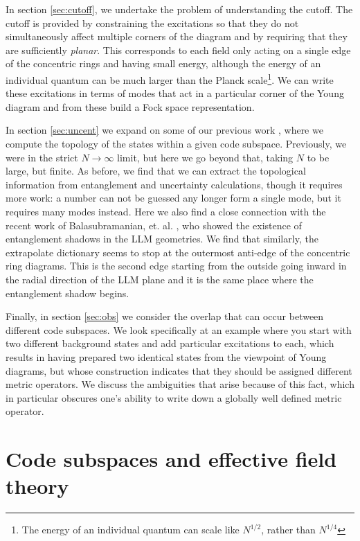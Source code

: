 \documentclass[12pt,nofootinbib, longbibliography]{revtex4-1}
\begin{document}
In section \ref{sec:cutoff}, we undertake the problem of understanding the cutoff. The cutoff is provided by constraining the excitations so that they do not simultaneously affect multiple corners of the diagram and by requiring that they are sufficiently {\em planar}. This corresponds to each field only acting on a single edge of the concentric rings and having small energy, although the energy of an individual quantum can be much larger than the Planck scale\footnote{The energy of an individual quantum can scale like $N^{1/2}$, rather than $N^{1/4}$}. We can write these excitations in terms of modes that act in a particular corner of the Young diagram and from these build a Fock space representation.

In section  \ref{sec:uncent} we expand on some of our previous work \cite{Berenstein:2017abm, Berenstein:2016pcx}, where we  compute the topology of the states within a given code subspace. Previously, we were in the strict $N\rightarrow\infty$ limit, but here we  go beyond that, taking $N$ to be large, but finite. As before, we find that we can extract the topological information from entanglement and uncertainty calculations, though it requires more work: a number can not be guessed any longer form a single mode, but it requires many modes instead.
Here we also find a close connection with the recent work of Balasubramanian, et. al. \cite{Balasubramanian:2017hgy}, who showed the existence of entanglement shadows in the LLM geometries. We find that similarly, the extrapolate dictionary seems to stop at the outermost anti-edge of the concentric ring diagrams. This is the second edge starting from the outside going inward in the radial direction of the LLM plane and it is the same place where the entanglement shadow begins.

Finally, in section \ref{sec:obs} we consider the overlap that can occur between different code subspaces. We look specifically at an example where you start with two different background states and add particular excitations to each, which results in having prepared two identical states from the viewpoint of Young diagrams, but whose construction indicates that they should be assigned different metric operators. We discuss the ambiguities that arise because of this fact, which in particular obscures one's ability to write down a globally well defined metric operator.


\section{Code subspaces and effective field theory}\label{sec:eff}
\end{document}
